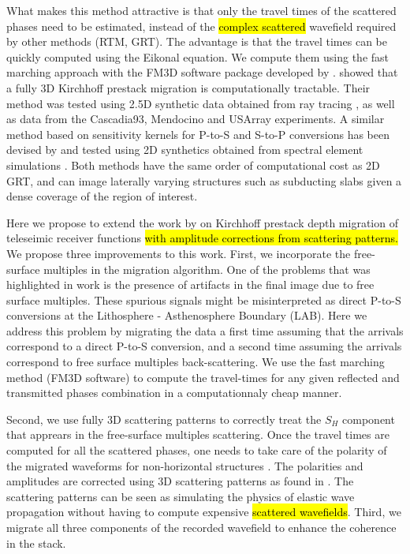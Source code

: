 \documentclass[10pt,a4paper]{article}
\begin{document}
What makes this method attractive is that only the travel times of the scattered phases need to be estimated, instead of the \hl{complex scattered} wavefield required by other methods (RTM, GRT). 
The advantage is that the travel times can be quickly computed using the Eikonal equation. 
We compute them using the fast marching approach with the FM3D software package developed by \citet{deko_gji_06}.
\citet{cheng_gji_16,cheng_grl_17} showed that a fully 3D Kirchhoff prestack migration is computationally tractable. 
Their method was tested using 2.5D synthetic data obtained from ray tracing \citep[Raysum,][]{fred_gji_00}, as well as data from the Cascadia93, Mendocino and USArray experiments.
A similar method based on sensitivity kernels for P-to-S and S-to-P conversions has been devised by \citet{hans_ggg_17} and tested using 2D synthetics obtained from spectral element simulations \citep[Specfem2D,][]{trom_ccp_08}. 
Both methods have the same order of computational cost as 2D GRT, and can image laterally varying structures such as subducting slabs given a dense coverage of the region of interest.

Here we propose to extend the work by \citet{cheng_gji_16} on Kirchhoff prestack depth migration of teleseimic receiver functions \hl{with amplitude corrections from scattering patterns.}
We propose three improvements to this work.
First, we incorporate the free-surface multiples in the migration algorithm.
One of the problems that was highlighted in \citet{cheng_gji_16} work is the presence of artifacts in the final image due to free surface multiples. 
These spurious signals might be misinterpreted as direct P-to-S conversions at the Lithosphere - Asthenosphere Boundary (LAB). 
Here we address this problem by migrating the data a first time assuming that the arrivals correspond to a direct P-to-S conversion, and a second time assuming the arrivals correspond to free surface multiples back-scattering. 
We use the fast marching method (FM3D software) to compute the travel-times for any given reflected and transmitted phases combination in a computationnaly cheap manner.

Second, we use fully 3D scattering patterns to correctly treat the $S_H$ component that apprears in the free-surface multiples scattering.
Once the travel times are computed for all the scattered phases, one needs to take care of the polarity of the migrated waveforms for non-horizontal structures \citep{tone_epsl_08,cheng_gji_16}.
The polarities and amplitudes are corrected using 3D scattering patterns as found in \citet{beyl_wamo_90}.
The scattering patterns can be seen as simulating the physics of elastic wave propagation without having to compute expensive \hl{scattered wavefields}.
Third, we migrate all three components of the recorded wavefield to enhance the coherence in the stack.
\end{document}
